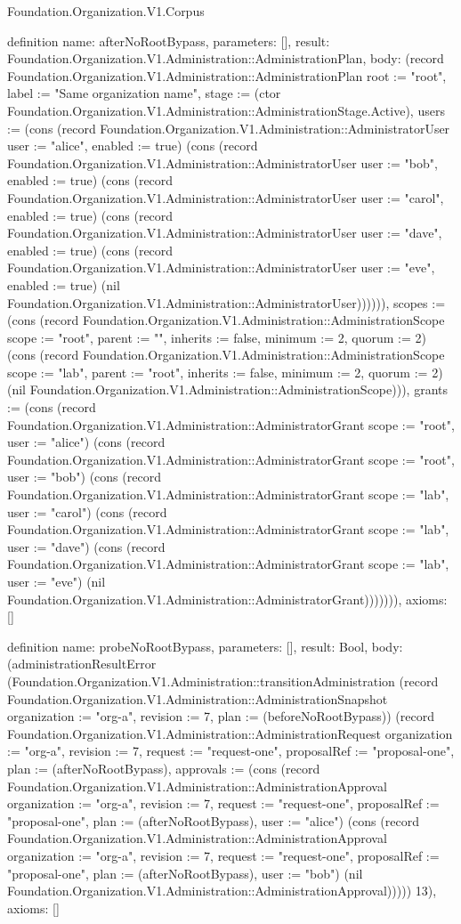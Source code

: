 \begin{lexlean}{Foundation.Organization.V1.Corpus}
\begin{semanticmodule}
definition{
  name: afterNoRootBypass,
  parameters: [],
  result: Foundation.Organization.V1.Administration::AdministrationPlan,
  body: (record Foundation.Organization.V1.Administration::AdministrationPlan {root := "root", label := "Same organization name", stage := (ctor Foundation.Organization.V1.Administration::AdministrationStage.Active), users := (cons (record Foundation.Organization.V1.Administration::AdministratorUser {user := "alice", enabled := true}) (cons (record Foundation.Organization.V1.Administration::AdministratorUser {user := "bob", enabled := true}) (cons (record Foundation.Organization.V1.Administration::AdministratorUser {user := "carol", enabled := true}) (cons (record Foundation.Organization.V1.Administration::AdministratorUser {user := "dave", enabled := true}) (cons (record Foundation.Organization.V1.Administration::AdministratorUser {user := "eve", enabled := true}) (nil Foundation.Organization.V1.Administration::AdministratorUser)))))), scopes := (cons (record Foundation.Organization.V1.Administration::AdministrationScope {scope := "root", parent := "", inherits := false, minimum := 2, quorum := 2}) (cons (record Foundation.Organization.V1.Administration::AdministrationScope {scope := "lab", parent := "root", inherits := false, minimum := 2, quorum := 2}) (nil Foundation.Organization.V1.Administration::AdministrationScope))), grants := (cons (record Foundation.Organization.V1.Administration::AdministratorGrant {scope := "root", user := "alice"}) (cons (record Foundation.Organization.V1.Administration::AdministratorGrant {scope := "root", user := "bob"}) (cons (record Foundation.Organization.V1.Administration::AdministratorGrant {scope := "lab", user := "carol"}) (cons (record Foundation.Organization.V1.Administration::AdministratorGrant {scope := "lab", user := "dave"}) (cons (record Foundation.Organization.V1.Administration::AdministratorGrant {scope := "lab", user := "eve"}) (nil Foundation.Organization.V1.Administration::AdministratorGrant))))))}),
  axioms: []
}

definition{
  name: probeNoRootBypass,
  parameters: [],
  result: Bool,
  body: (administrationResultError (Foundation.Organization.V1.Administration::transitionAdministration (record Foundation.Organization.V1.Administration::AdministrationSnapshot {organization := "org-a", revision := 7, plan := (beforeNoRootBypass)}) (record Foundation.Organization.V1.Administration::AdministrationRequest {organization := "org-a", revision := 7, request := "request-one", proposalRef := "proposal-one", plan := (afterNoRootBypass), approvals := (cons (record Foundation.Organization.V1.Administration::AdministrationApproval {organization := "org-a", revision := 7, request := "request-one", proposalRef := "proposal-one", plan := (afterNoRootBypass), user := "alice"}) (cons (record Foundation.Organization.V1.Administration::AdministrationApproval {organization := "org-a", revision := 7, request := "request-one", proposalRef := "proposal-one", plan := (afterNoRootBypass), user := "bob"}) (nil Foundation.Organization.V1.Administration::AdministrationApproval)))})) 13),
  axioms: []
}


\end{semanticmodule}
\end{lexlean}
